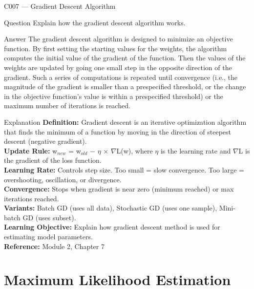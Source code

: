 \documentclass[aspectratio=169,8pt]{beamer}
\begin{document}
	\begin{frame}{C007 --- Gradient Descent Algorithm}
		\begin{block}{Question}
			Explain how the gradient descent algorithm works.
		\end{block}
		\begin{block}{Answer}
			The gradient descent algorithm is designed to minimize an objective function. By first setting the starting values for the weights, the algorithm computes the initial value of the gradient of the function. Then the values of the weights are updated by going one small step in the opposite direction of the gradient. Such a series of computations is repeated until convergence (i.e., the magnitude of the gradient is smaller than a prespecified threshold, or the change in the objective function's value is within a prespecified threshold) or the maximum number of iterations is reached.
		\end{block}
		\begin{block}{Explanation}
			\textbf{Definition:} Gradient descent is an iterative optimization algorithm that finds the minimum of a function by moving in the direction of steepest descent (negative gradient).\\
			\textbf{Update Rule:} w$_{new}$ = w$_{old}$ $-$ $\eta$ $\times$ $\nabla$L(w), where $\eta$ is the learning rate and $\nabla$L is the gradient of the loss function.\\
			\textbf{Learning Rate:} Controls step size. Too small = slow convergence. Too large = overshooting, oscillation, or divergence.\\
			\textbf{Convergence:} Stops when gradient is near zero (minimum reached) or max iterations reached.\\
			\textbf{Variants:} Batch GD (uses all data), Stochastic GD (uses one sample), Mini-batch GD (uses subset).\\
			\textbf{Learning Objective:} Explain how gradient descent method is used for estimating model parameters.\\
			\textbf{Reference:} Module 2, Chapter 7
		\end{block}
	\end{frame}
	
	\section{Maximum Likelihood Estimation}
	
\end{document}
